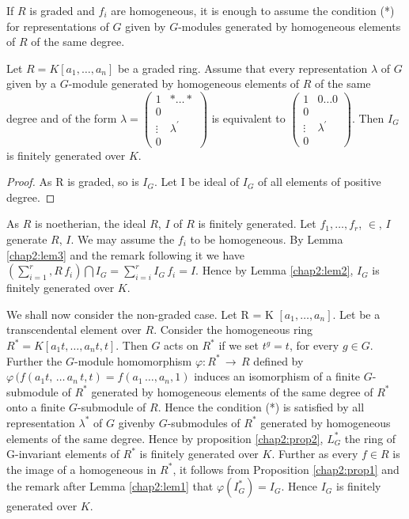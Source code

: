  \begin{remark*}
 If $R$ is graded and  $f_i $ are homogeneous, it is enough to assume
 the condition (*) for representations of $G$ given by $G$-modules
 generated by homogeneous elements of $R$ of the same degree. 
  \end{remark*} 

 \begin{proposition}\label{chap2:prop2}%
 Let $R = K [a_1, \ldots , a_n]$ be a graded ring.  Assume that
 every representation $ \lambda$ of $G$ given by a $G$-module
 generated by homogeneous elements of $R$ of the same degree and of
 the form  $\lambda = \begin{pmatrix} 1 & *\dots *\\ 0 &  \\ \vdots &
   \lambda^{\prime}\\ 0 \end{pmatrix} $ is equivalent to
 $ \begin{pmatrix} 1 & 0\dots 0\\ 0 &  \\ \vdots &
   \lambda^{\prime}\\ 0 \end{pmatrix}$. Then $ I_G $ is finitely
 generated over $K$. 
    \end{proposition} 

\begin{proof}
 As R is graded, so is $I_G$. Let I be ideal of $I_G$ of all
 elements of positive degree. 
\end{proof}  

As $R$ is noetherian, the ideal $R$, $I$ of $R$ is finitely
generated. Let $f_1, \ldots , f_r$, $\in$, $I$ generate $R$, $I$. We
may assume the $ f_i $ to be homogeneous. By Lemma  \ref{chap2:lem3}
and the remark 
following it we have $ (\sum\limits^r_{i=1}, R \, f_i) \bigcap I_G =
\sum\limits_{i=i}^r I_G \, f_i = I$. Hence by Lemma  \ref{chap2:lem2}, $I_G $ is
finitely generated over $K$.   

We shall now consider the non-graded case. Let R = K $ [a_1, \ldots ,
  a_n]$. Let be a transcendental element over $R$. Consider the
homogeneous ring $ R^{*} =K  [a_1 t , \ldots , a_n t, t]$. Then $G$
acts on $ R^{*} $ if we set $t^{g} =t$, for every $ g\in G$. Further
the $G$-module homomorphism $ \varphi : R^{*} \, \rightarrow \,R$
defined by $\varphi\, (f(a_1 t, \,\ldots \,a_n \, t, t) = f (a_1 \,
\ldots , a_n , 1) $ induces an isomorphism of a finite $G$-submodule
of $ R^{*} $ generated by homogeneous elements of the same degree of $
R^{*} $ onto a finite $G$-submodule of $R$. 
Hence the condition (*) is satisfied by all representation 
$\lambda^{*}$ of $G$ given\pageoriginale by $G$-submodules of $ R^{*}$
generated by homogeneous elements  
of the same degree. Hence by proposition \ref{chap2:prop2}, $L^{*}_G$ the ring of
G-invariant elements of $R^{*}$ is finitely generated over
$K$. Further as every  $ f \in R $ is the image of a homogeneous in $
R^{*}$, it follows from Proposition \ref{chap2:prop1} and the remark after Lemma
\ref{chap2:lem1} that $\varphi(I^{*}_G) = I_G$. Hence $I_G$ is
finitely generated 
over $K$. 

